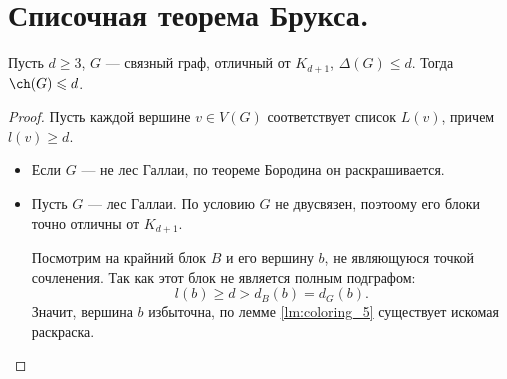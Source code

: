 \section{Списочная теорема Брукса.}
\begin{theorem}[Визинг, 1976]
    Пусть $d \ge 3$, $G$ --- связный граф, отличный от $K_{d+1}$, $\Delta(G) \le d$. Тогда $\ch(G) \le d$.
\end{theorem}
\begin{proof}
    Пусть каждой вершине $v \in V(G)$ соответствует список $L(v)$, причем $l(v) \ge d$.

	\begin{itemize}
		\item Если $G$ --- не лес Галлаи, по теореме Бородина он раскрашивается.
		\item Пусть $G$ --- лес Галлаи. По условию $G$ не двусвязен, поэтоому его блоки точно отличны от $K_{d+1}$.

			Посмотрим на крайний блок $B$ и его вершину $b$, не являющуюся точкой сочленения. Так как этот блок не является полным подграфом:
			\[
			l(b) \ge d > d_{B}(b) = d_{G}(b)
			.\] 
			Значит, вершина $b$ избыточна, по лемме \ref{lm:coloring_5} существует искомая раскраска.
	\end{itemize}

\end{proof}
